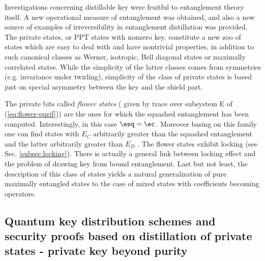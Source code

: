 \documentclass[twocolumn,aps,rmp]{revtex4}
\begin{document}
Investigations concerning distillable key were fruitful to
entanglement theory itself. A new operational measure
of entanglement was obtained, and also a new source of examples of
irreversibility in entanglement distillation was provided.
The private states, or PPT states with nonzero key,
constitute a new zoo of states which are easy to deal with and have
nontrivial properties, in addition to such canonical classes as
Werner, isotropic, Bell diagonal states or maximally correlated
states.
While the simplicity of the latter classes comes from symmetries (e.g. invariance under twirling), simplicity of the class of private states is based just on special asymmetry between the key and the shield part.

 The private bits called {\it flower states} ( given by trace over subsystem E of (\ref{eq:flower-purif})) are the ones for which the squashed entanglement has been
computed. Interestingly, in this case $\esq=\ec$. Moreover basing on this family one can find states with $E_C$ arbitrarily greater than the squashed entanglement and the
latter arbitrarily greater than $E_D$ \cite{Winter-squashed-ent}. The
flower states exhibit locking (see Sec. \ref{subsec:locking}).  There is actually a general link between locking effect and the problem of
drawing key from bound entanglement. Last but not least, the
description of this class of states yields a natural generalization of
pure maximally entangled states to the case of mixed states with
coefficients becoming operators.

\subsection{Quantum key distribution schemes and security proofs
based on distillation of private states - private key beyond purity}
\end{document}

